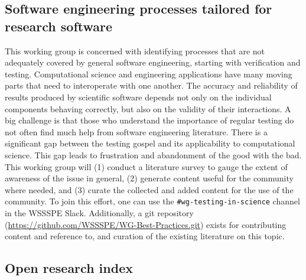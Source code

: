 \documentclass[11pt, oneside]{amsart}
\newcommand{\note}[1]{ {\textcolor{blueish}    { ***Note:      #1 }}}
\begin{document}
\subsection{Software engineering processes tailored for research software}
\label{sec:soft-eng}


This working group is concerned with identifying processes that are not adequately
covered by general software engineering, starting with verification and testing.
Computational science and engineering applications have many moving
parts that need to interoperate with one another. The accuracy and
reliability of results produced by scientific software depends not
only on the individual components behaving correctly, but also on the
validity of their interactions.
A big challenge is that those who understand
the importance of regular testing do not often find much help from
software engineering literature. There is a significant gap between
the testing gospel and its applicability to computational science. This
gap leads to frustration and abandonment of the good with the bad. 
%
This working group will (1) conduct a literature survey to gauge the extent
of awareness of the issue in general, (2) generate content useful for
the community where needed, and (3) curate the collected and added
content for the use of the community.
%
To join this effort, one can use the \texttt{\#wg-testing-in-science}
channel in the WSSSPE Slack.
Additionally, a git
repository (\url{https://github.com/WSSSPE/WG-Best-Practices.git}) exists for contributing content and reference to, and
curation of the existing literature on this topic.


\subsection{Open research index}
\label{sec:open-research-index}

\end{document}
